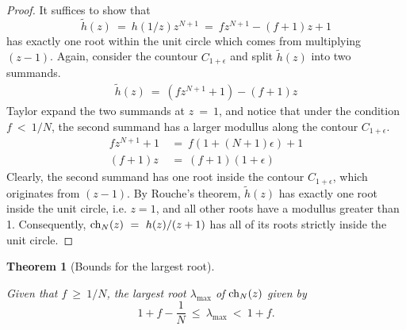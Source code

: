 \documentclass[11pt,reqno]{amsart}
\numberwithin{equation}{section}
\theoremstyle{plain}
\newtheorem{theorem}[thm]{Theorem}
\newcommand{\ch}{\textnormal{ch}}
\begin{document}
\begin{proof}
    It suffices to show that 
    \begin{equation}
        \widetilde h(z) \ = \ h (1/z) z^{N + 1} \ = \ fz^{N + 1} - (f+1)z+1
    \end{equation} has exactly one root within the unit circle which 
    comes from multiplying \newline $(z - 1)$. Again, consider the countour 
    $C_{1+\epsilon}$ and split $\widetilde h (z)$ into two summands. 
    \begin{align}
        \widetilde h(z) \ = \ (f z^{N + 1} + 1) - (f + 1)z
    \end{align}
    Taylor expand the two summands at $z \ = \ 1$, and notice that under the condition 
    $f \ < \ 1/N$, the second summand has a larger modullus along the 
    contour $C_{1 + \epsilon}$. 
    \begin{align}
        fz^{N + 1} + 1 & \ = \ f(1 + (N + 1)\epsilon) + 1  \\ 
        (f + 1)z & \ = \ (f + 1) (1 + \epsilon)
    \end{align} 
    Clearly, the second summand has one root inside the contour $C_{1 + \epsilon}$, 
    which originates from $(z - 1)$. By Rouche's theorem, $\widetilde h(z)$ 
    has exactly one root inside the unit circle, i.e. $z = 1$, and all 
    other roots have a modullus greater than 1. Consequently, $\ch_N(z) \ = \ h(z)/(z + 1)$ 
    has all of its roots strictly inside the unit circle.  
\end{proof}

\begin{theorem}[Bounds for the largest root]\label{thm:Bound}

 Given that $f \ \geq \ 1/N$, the largest root $\lambda_{\max}$ of $\ch_N(z)$ given by 
 \begin{equation}
 1 + f - \frac 1 {N} \ \leq\ \lambda_{\max} \ < \ 1 + f.
 \end{equation}
\end{theorem}
\end{document}
